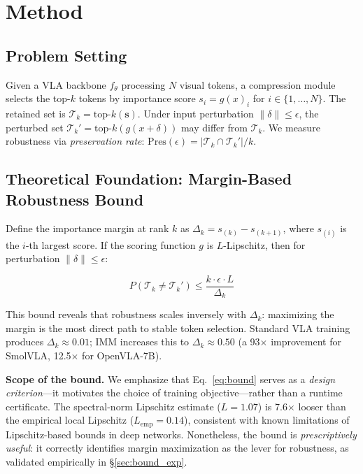 \documentclass[10pt,twocolumn]{article}
\begin{document}
\section{Method}
\label{sec:method}

\subsection{Problem Setting}
Given a VLA backbone $f_\theta$ processing $N$ visual tokens, a compression module selects the top-$k$ tokens by importance score $s_i = g(x)_i$ for $i \in \{1, \dots, N\}$. The retained set is $\mathcal{T}_k = \text{top-}k(\mathbf{s})$. Under input perturbation $\|\delta\| \leq \epsilon$, the perturbed set $\mathcal{T}_k' = \text{top-}k(g(x + \delta))$ may differ from $\mathcal{T}_k$. We measure robustness via \emph{preservation rate}: $\text{Pres}(\epsilon) = |\mathcal{T}_k \cap \mathcal{T}_k'| / k$.

\subsection{Theoretical Foundation: Margin-Based Robustness Bound}
\label{sec:theory}

Define the importance margin at rank $k$ as $\Delta_k = s_{(k)} - s_{(k+1)}$, where $s_{(i)}$ is the $i$-th largest score. If the scoring function $g$ is $L$-Lipschitz, then for perturbation $\|\delta\| \leq \epsilon$:

\begin{equation}
P(\mathcal{T}_k \neq \mathcal{T}_k') \leq \frac{k \cdot \epsilon \cdot L}{\Delta_k}
\label{eq:bound}
\end{equation}

This bound reveals that robustness scales inversely with $\Delta_k$: maximizing the margin is the most direct path to stable token selection. Standard VLA training produces $\Delta_k \approx 0.01$; IMM increases this to $\Delta_k \approx 0.50$ (a 93$\times$ improvement for SmolVLA, 12.5$\times$ for OpenVLA-7B).

\textbf{Scope of the bound.} We emphasize that Eq.~\ref{eq:bound} serves as a \emph{design criterion}---it motivates the choice of training objective---rather than a runtime certificate. The spectral-norm Lipschitz estimate ($L{=}1.07$) is 7.6$\times$ looser than the empirical local Lipschitz ($L_{\text{emp}}{=}0.14$), consistent with known limitations of Lipschitz-based bounds in deep networks. Nonetheless, the bound is \emph{prescriptively useful}: it correctly identifies margin maximization as the lever for robustness, as validated empirically in \S\ref{sec:bound_exp}.
\end{document}
